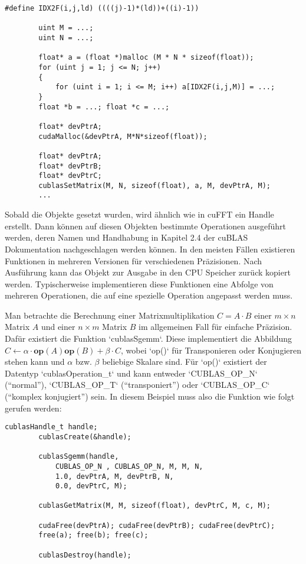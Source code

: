 		\begin{lstlisting}[caption=cuBLAS: Matrix setzen]
		#define IDX2F(i,j,ld) ((((j)-1)*(ld))+((i)-1))
		
		uint M = ...;
		uint N = ...;	

		float* a = (float *)malloc (M * N * sizeof(float));
		for (uint j = 1; j <= N; j++) 
		{
			for (uint i = 1; i <= M; i++) a[IDX2F(i,j,M)] = ...;
		}
		float *b = ...; float *c = ...;

		float* devPtrA;
		cudaMalloc(&devPtrA, M*N*sizeof(float));

		float* devPtrA;
		float* devPtrB;
		float* devPtrC;
		cublasSetMatrix(M, N, sizeof(float), a, M, devPtrA, M);
		...
		\end{lstlisting}
		
		Sobald die Objekte gesetzt wurden, wird ähnlich wie in cuFFT ein \Gls{Handle} erstellt. Dann können auf diesen Objekten bestimmte Operationen ausgeführt werden, deren Namen und Handhabung in Kapitel 2.4 der cuBLAS Dokumentation \autocite{cublasDoc} nachgeschlagen werden können. In den meisten Fällen existieren Funktionen in mehreren Versionen für verschiedenen Präzisionen. Nach Ausführung kann das Objekt zur Ausgabe in den CPU Speicher zurück kopiert werden. Typischerweise implementieren diese Funktionen eine Abfolge von mehreren Operationen, die auf eine spezielle Operation angepasst werden muss.
		
		Man betrachte die Berechnung einer Matrixmultiplikation $C = A\cdot B$ einer $m\times n$ Matrix $A$ und einer $n\times m$ Matrix $B$ im allgemeinen Fall für einfache Präzision. Dafür existiert die Funktion \li`cublasSgemm`. Diese implementiert die Abbildung $C \leftarrow \alpha\cdot\textbf{op}(A)\textbf{op}(B) + \beta\cdot C$, wobei \li`op()` für Transponieren oder Konjugieren stehen kann und $\alpha$ bzw. $\beta$ beliebige Skalare sind. Für \li`op()` existiert der Datentyp \li`cublasOperation_t` und kann entweder \li`CUBLAS_OP_N` (\enquote{normal}), \li`CUBLAS_OP_T` (\enquote{transponiert}) oder \li`CUBLAS_OP_C` (\enquote{komplex konjugiert}) sein. In diesem Beispiel muss also die Funktion wie folgt gerufen werden: 
		
		\begin{lstlisting}[caption=cuBLAS: Funktionsaufruf]
		cublasHandle_t handle;
		cublasCreate(&handle);
		
		cublasSgemm(handle, 
			CUBLAS_OP_N , CUBLAS_OP_N, M, M, N, 
			1.0, devPtrA, M, devPtrB, N, 
			0.0, devPtrC, M);
		
		cublasGetMatrix(M, M, sizeof(float), devPtrC, M, c, M);
		
		cudaFree(devPtrA); cudaFree(devPtrB); cudaFree(devPtrC);			
		free(a); free(b); free(c);
		
		cublasDestroy(handle);
		\end{lstlisting}
		
